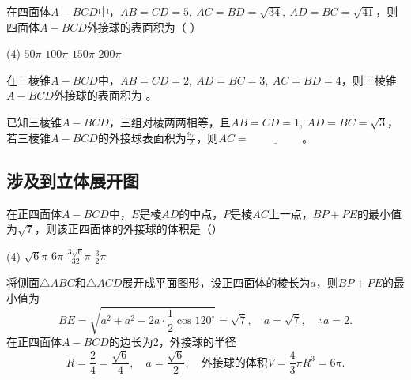 \begin{example}
    在四面体$A - BCD$中，$AB = CD = 5, \ AC = BD = \sqrt{34}, \ AD = BC = \sqrt{41}$，则四面体$A - BCD$外接球的表面积为（ \hspace{1.5cm} ）
    \begin{tasks}(4)
        \task $50\pi$
        \task $100\pi$
        \task $150\pi$
        \task $200\pi$
    \end{tasks}
\end{example}

\begin{example}
    在三棱锥$A - BCD$中，$AB = CD = 2,\ AD = BC = 3,\ AC = BD = 4$，则三棱锥$A - BCD$外接球的表面积为 \underline{\hspace{2cm}}。
\end{example}

\vspace{5em}

\begin{example}
    已知三棱锥$A - BCD$，三组对棱两两相等，且$AB = CD = 1,\ AD = BC = \sqrt{3}$，若三棱锥$A - BCD$的外接球表面积为$\frac{9\pi}{2}$，则$AC = \underline{\hspace{2cm}}$。
\end{example}

\subsection{涉及到立体展开图}

\begin{example}
    在正四面体$A - BCD$中，$E$是棱$AD$的中点，$P$是棱$AC$上一点，$BP + PE$的最小值为$\sqrt{7}$，则该正四面体的外接球的体积是（\hspace{1.5cm}）
    \begin{tasks}(4)
        \task $\sqrt{6}\pi$
        \task $6\pi$
        \task $\frac{3\sqrt{6}}{32}\pi$
        \task $\frac{3}{2}\pi$
    \end{tasks}
\end{example}

\begin{solution}
    将侧面$\triangle ABC$和$\triangle ACD$展开成平面图形，设正四面体的棱长为$a$，则$BP + PE$的最小值为
    \[
        BE = \sqrt{a^2 + a^2 - 2a \cdot \frac{1}{2} \cos 120^\circ} = \sqrt{7}, \quad a = \sqrt{7}, \quad \therefore a = 2.
    \]
    在正四面体$A - BCD$的边长为2，外接球的半径
    \[
        R = \frac{2}{4} = \frac{\sqrt{6}}{4}, \quad a = \frac{\sqrt{6}}{2}, \quad 外接球的体积 V = \frac{4}{3}\pi R^3 = 6\pi.
    \]
\end{solution}

